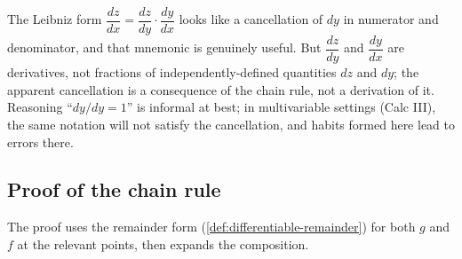 \begin{caution}
The Leibniz form \(\dfrac{dz}{dx} = \dfrac{dz}{dy} \cdot \dfrac{dy}{dx}\) looks like a cancellation of \(dy\) in numerator and denominator, and that mnemonic is genuinely useful. But \(\dfrac{dz}{dy}\) and \(\dfrac{dy}{dx}\) are derivatives, not fractions of independently-defined quantities \(dz\) and \(dy\); the apparent cancellation is a consequence of the chain rule, not a derivation of it. Reasoning ``\(dy / dy = 1\)'' is informal at best; in multivariable settings (Calc III), the same notation will not satisfy the cancellation, and habits formed here lead to errors there.
\end{caution}

\subsection{Proof of the chain rule}

The proof uses the remainder form (\cref{def:differentiable-remainder}) for both \(g\) and \(f\) at the relevant points, then expands the composition.

